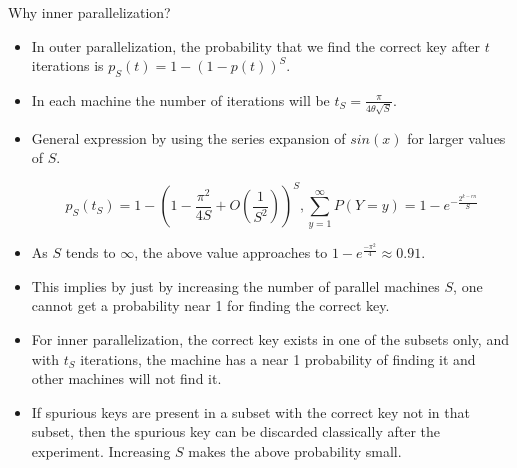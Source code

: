 \begin{frame}{Why inner parallelization?}
    \begin{itemize}
        \item In outer parallelization, the probability that we find the correct key after $t$ iterations is $p_S(t) = 1 - (1-p(t))^S$.
        \pause
        \item In each machine the number of iterations will be $t_S = \frac{\pi}{4\theta\sqrt{S}}$.
        \pause
        \item General expression by using the series expansion of $sin(x)$ for larger values of $S$.
        \pause

\begin{equation*}
    p_S(t_S) = 1 - \left( 1 - \frac{\pi^2}{4S} + O\left(\frac{1}{S^2}\right) \right)^S, \sum_{y = 1}^\infty P(Y = y) = 1 - e^{-\frac{2^{k-rn}}{S}} 
\end{equation*}
\pause
\item As $S$ tends to $\infty$, the above value approaches to $1 - e^{\frac{-\pi^2}{4}} \approx 0.91$.
\pause\item This implies by just by increasing the number of parallel machines $S$, one cannot get a probability near 1 for finding the correct key.
\pause
\item For inner parallelization, the correct key exists in one of the subsets only, and with $t_S$ iterations, the machine has a near 1 probability of finding it and other machines will not find it.
\pause
\item  If spurious keys are present in a subset with the correct key not in that subset, then the spurious key can be discarded classically after the experiment. Increasing $S$ makes the above probability small. 
    \end{itemize}
\end{frame}
